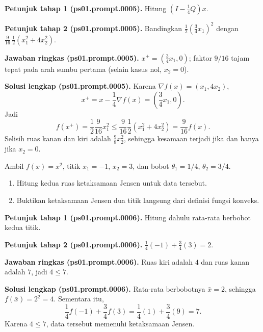 \par\noindent\textbf{Petunjuk tahap 1 (ps01.prompt.0005).}
Hitung $(I-\tfrac14Q)x$.
\label{orig03:ps01:hint1:0005}
\par\noindent\textbf{Petunjuk tahap 2 (ps01.prompt.0005).}
Bandingkan $\tfrac12(\tfrac34x_1)^2$ dengan
$\tfrac9{16}\,\tfrac12(x_1^2+4x_2^2)$.
\label{orig03:ps01:hint2:0005}
\par\noindent\textbf{Jawaban ringkas (ps01.prompt.0005).}
$x^+=(\tfrac34x_1,0)$; faktor $9/16$ tajam tepat pada arah sumbu pertama
(selain kasus nol, $x_2=0$).
\label{orig03:ps01:answer:0005}
\par\noindent\textbf{Solusi lengkap (ps01.prompt.0005).}
Karena $\nabla f(x)=(x_1,4x_2)$,
\[
 x^+=x-\frac14\nabla f(x)=\left(\frac34x_1,0\right).
\]
Jadi
\[
 f(x^+)=\frac12\frac9{16}x_1^2
 \leq \frac9{16}\frac12(x_1^2+4x_2^2)=\frac9{16}f(x).
\]
Selisih ruas kanan dan kiri adalah $\tfrac98x_2^2$, sehingga kesamaan
terjadi jika dan hanya jika $x_2=0$.
\label{orig03:ps01:solution:0005}

\begin{exercise}
\label{orig03:ps01:problem:0003}
Ambil $f(x)=x^2$, titik $x_1=-1$, $x_2=3$, dan bobot
$\theta_1=1/4$, $\theta_2=3/4$.
\begin{enumerate}
\item\label{orig03:ps01:prompt:0006}
Hitung kedua ruas ketaksamaan Jensen untuk data tersebut.
\item\label{orig03:ps01:prompt:0007}
Buktikan ketaksamaan Jensen dua titik langsung dari definisi fungsi konveks.
\end{enumerate}
\end{exercise}

\par\noindent\textbf{Petunjuk tahap 1 (ps01.prompt.0006).}
Hitung dahulu rata-rata berbobot kedua titik.
\label{orig03:ps01:hint1:0006}
\par\noindent\textbf{Petunjuk tahap 2 (ps01.prompt.0006).}
$\tfrac14(-1)+\tfrac34(3)=2$.
\label{orig03:ps01:hint2:0006}
\par\noindent\textbf{Jawaban ringkas (ps01.prompt.0006).}
Ruas kiri adalah $4$ dan ruas kanan adalah $7$, jadi $4\leq7$.
\label{orig03:ps01:answer:0006}
\par\noindent\textbf{Solusi lengkap (ps01.prompt.0006).}
Rata-rata berbobotnya $\bar x=2$, sehingga $f(\bar x)=2^2=4$.
Sementara itu,
\[
 \frac14f(-1)+\frac34f(3)=\frac14(1)+\frac34(9)=7.
\]
Karena $4\leq7$, data tersebut memenuhi ketaksamaan Jensen.
\label{orig03:ps01:solution:0006}

